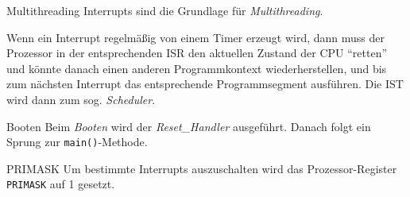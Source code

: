 \begin{defi}{Multithreading}
    Interrupts sind die Grundlage für \emph{Multithreading}.

    Wenn ein Interrupt regelmäßig von einem Timer erzeugt wird, dann muss der Prozessor in der entsprechenden ISR den aktuellen Zustand der CPU \enquote{retten} und könnte danach einen anderen Programmkontext wiederherstellen, und bis zum nächsten Interrupt das entsprechende Programmsegment ausführen.
    Die IST wird dann zum sog. \emph{Scheduler}.
\end{defi}

\begin{defi}{Booten}
    Beim \emph{Booten} wird der \emph{Reset\_Handler} ausgeführt.
    Danach folgt ein Sprung zur \texttt{main()}-Methode.
\end{defi}

\begin{defi}{PRIMASK}
    Um bestimmte Interrupts auszuschalten wird das Prozessor-Register \texttt{PRIMASK} auf 1 gesetzt.
\end{defi}

